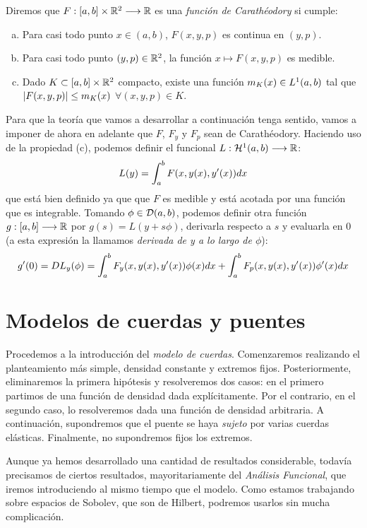 \begin{definition}
Diremos que $F : [a,b]\times\mathbb{R}^2 \longrightarrow \mathbb{R}$ es una \textit{función de Carathéodory} si cumple:
\begin{enumerate}[(a)]
\item Para casi todo punto $x\in(a,b)$, $F(x,y,p)$ es continua en $(y,p)$.
\item Para casi todo punto $(y,p)\in\mathbb{R}^2$, la función $x\mapsto F(x,y,p)$ es medible.
\item Dado $K\subset[a,b]\times\mathbb{R}^2$ compacto, existe una función $m_K(x)\in L^{ 1 }(a,b)$ tal que $\left| F(x,y,p) \right|\leq m_K(x)$ $\forall(x,y,p)\in K$.
\end{enumerate}
\end{definition}

Para que la teoría que vamos a desarrollar a continuación tenga sentido, vamos a imponer de ahora en adelante que $F$, $F_y$ y $F_p$ sean de Carathéodory. Haciendo uso de la propiedad (c), podemos definir el funcional $L : \mathcal{H}^{ 1 } (a,b) \longrightarrow \mathbb{R}$:
\[
L(y)=\displaystyle\int_{ a }^{ b } F(x,y(x),y'(x))dx
\]
que está bien definido ya que que $F$ es medible y está acotada por una función que es integrable. Tomando $\phi\in\mathcal{D}(a,b)$, podemos definir otra función $g : [a,b] \longrightarrow \mathbb{R}$ por $g(s)=L(y+s\phi)$, derivarla respecto a $s$ y evaluarla en 0 (a esta expresión la llamamos \textit{derivada de y a lo largo de $\phi$}):
\[
g'(0)=DL_y(\phi)=\displaystyle\int_{ a }^{ b } F_y(x,y(x),y'(x))\phi(x)dx+\displaystyle\int_{ a }^{ b } F_p(x,y(x),y'(x))\phi'(x)dx
\]
\newpage

\section{Modelos de cuerdas y puentes}

Procedemos a la introducción del \textit{modelo de cuerdas}. Comenzaremos realizando el planteamiento más simple, densidad constante y extremos fijos. Posteriormente, eliminaremos la primera hipótesis y resolveremos dos casos: en el primero partimos de una función de densidad dada explícitamente. Por el contrario, en el segundo caso, lo resolveremos dada una función de densidad arbitraria. A continuación, supondremos que el puente se haya \textit{sujeto} por varias cuerdas elásticas. Finalmente, no supondremos fijos los extremos.

Aunque ya hemos desarrollado una cantidad de resultados considerable, todavía precisamos de ciertos resultados, mayoritariamente del \textit{Análisis Funcional}, que iremos introduciendo al mismo tiempo que el modelo. Como estamos trabajando sobre espacios de Sobolev, que son de Hilbert, podremos usarlos sin mucha complicación.

